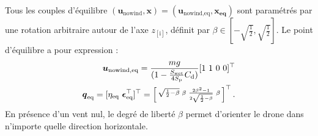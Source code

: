         Tous les couples d'équilibre $(\boldsymbol{u}_{\text{nowind}}, \boldsymbol{x}) = (\boldsymbol{u}_{\text{nowind},\text{eq}}, \boldsymbol{x_{\text{eq}}})$ sont paramétrés par une rotation arbitraire autour de l'axe $z_{[\text{i}]}$, définit par $\beta \in \left[-\sqrt{\frac{1}{2}},\sqrt{\frac{1}{2}}\right]$. Le point d'équilibre a pour expression :
        \begin{subequations}
            \label{eq:equilibria}
            \begin{align}
                \label{eq:bar_u}
                \boldsymbol{u}_{\text{nowind},\text{eq}} = \frac{mg}{( 1-\frac{S_{\text{wet}}}{4S_{\text{p}}} C_{\text{d}})} [1~1~0~0]^\top\\
                \boldsymbol{q}_{\text{eq}} = [\eta_{\text{eq}} ~\boldsymbol{\epsilon}_{\text{eq}}^\top]^\top = \left[ \begin{smallmatrix}\sqrt{\frac{1}{2}-\beta} & \beta & \frac{2\beta^{2}-1}{2\sqrt{\frac{1}{2}-\beta}} & \beta \end{smallmatrix} \right]^\top.
            \end{align}
        \end{subequations}
        En présence d'un vent nul, le degré de liberté $\beta$ permet d'orienter le drone dans n'importe quelle direction horizontale.

